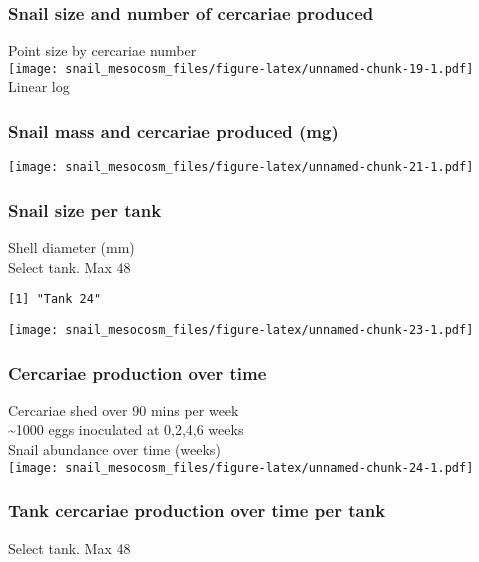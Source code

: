 \documentclass[10,portrait]{article}
\begin{document}
\subsubsection{Snail size and number of cercariae
produced}\label{snail-size-and-number-of-cercariae-produced}

Point size by cercariae number\\
\texttt{[image: snail\_mesocosm\_files/figure-latex/unnamed-chunk-19-1.pdf]}
Linear log

\subsubsection{Snail mass and cercariae produced
(mg)}\label{snail-mass-and-cercariae-produced-mg}

\texttt{[image: snail\_mesocosm\_files/figure-latex/unnamed-chunk-21-1.pdf]}

\subsubsection{Snail size per tank}\label{snail-size-per-tank-1}

Shell diameter (mm)\\
Select tank. Max 48

\begin{verbatim}
[1] "Tank 24"
\end{verbatim}

\texttt{[image: snail\_mesocosm\_files/figure-latex/unnamed-chunk-23-1.pdf]}

\subsubsection{Cercariae production over
time}\label{cercariae-production-over-time}

Cercariae shed over 90 mins per week\\
\textasciitilde{}1000 eggs inoculated at 0,2,4,6 weeks\\
Snail abundance over time (weeks)\\
\texttt{[image: snail\_mesocosm\_files/figure-latex/unnamed-chunk-24-1.pdf]}

\subsubsection{Tank cercariae production over time per
tank}\label{tank-cercariae-production-over-time-per-tank}

Select tank. Max 48
\end{document}
